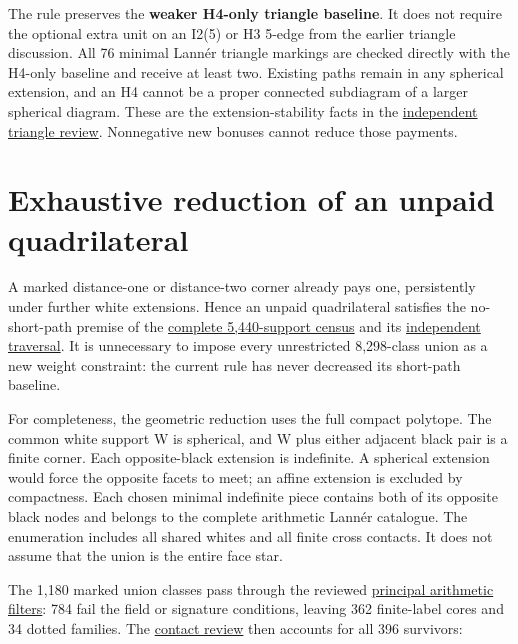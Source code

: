 \documentclass[
  10pt,
]{report}
\begin{document}
The rule preserves the \textbf{weaker H4-only triangle baseline}. It
does not require the optional extra unit on an I2(5) or H3 5-edge from
the earlier triangle discussion. All 76 minimal Lannér triangle markings
are checked directly with the H4-only baseline and receive at least two.
Existing paths remain in any spherical extension, and an H4 cannot be a
proper connected subdiagram of a larger spherical diagram. These are the
extension-stability facts in the
\href{fresh_sqrt5_triangle_weights_20261015_review.md}{independent
triangle review}. Nonnegative new bonuses cannot reduce those payments.

\section{Exhaustive reduction of an unpaid
quadrilateral}\label{exhaustive-reduction-of-an-unpaid-quadrilateral}

A marked distance-one or distance-two corner already pays one,
persistently under further white extensions. Hence an unpaid
quadrilateral satisfies the no-short-path premise of the
\href{fresh_sqrt5_quad_exhaustion_20261015.md}{complete 5,440-support
census} and its
\href{fresh_sqrt5_quad_exhaustion_20261015_incidence_review.md}{independent
traversal}. It is unnecessary to impose every unrestricted 8,298-class
union as a new weight constraint: the current rule has never decreased
its short-path baseline.

For completeness, the geometric reduction uses the full compact
polytope. The common white support W is spherical, and W plus either
adjacent black pair is a finite corner. Each opposite-black extension is
indefinite. A spherical extension would force the opposite facets to
meet; an affine extension is excluded by compactness. Each chosen
minimal indefinite piece contains both of its opposite black nodes and
belongs to the complete arithmetic Lannér catalogue. The enumeration
includes all shared whites and all finite cross contacts. It does not
assume that the union is the entire face star.

The 1,180 marked union classes pass through the reviewed
\href{fresh_sqrt5_quad_filters_20261015_review.md}{principal arithmetic
filters}: 784 fail the field or signature conditions, leaving 362
finite-label cores and 34 dotted families. The
\href{fresh_sqrt5_quad_contacts_20261015_review.md}{contact review} then
accounts for all 396 survivors:
\end{document}
